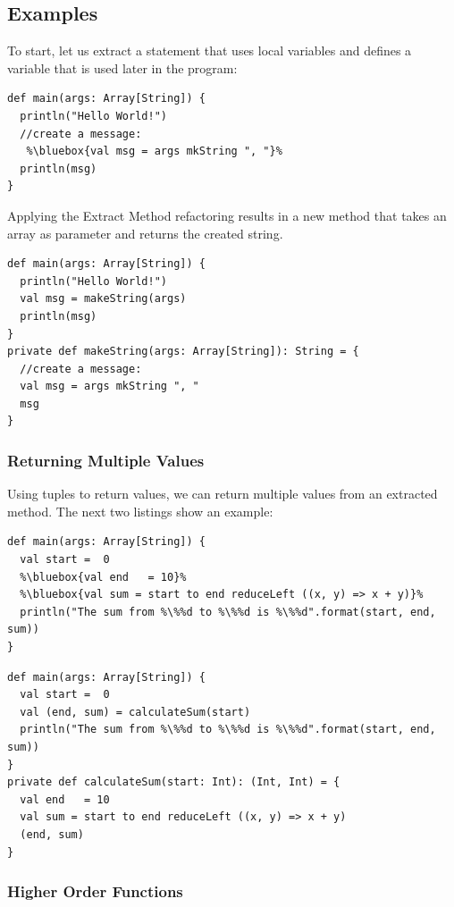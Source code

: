 \documentclass[10pt,a4paper,oneside]{scrreprt}
\begin{document}
\subsection{Examples}

To start, let us extract a statement that uses local variables and defines a variable that is used later in the program:

\begin{lstlisting}
def main(args: Array[String]) {
  println("Hello World!")
  //create a message:
   %\bluebox{val msg = args mkString ", "}%
  println(msg)
}
\end{lstlisting}

Applying the Extract Method refactoring results in a new method that takes an array as parameter and returns the created string.

\begin{lstlisting}
def main(args: Array[String]) {
  println("Hello World!")
  val msg = makeString(args)
  println(msg)
}
private def makeString(args: Array[String]): String = {
  //create a message:
  val msg = args mkString ", "
  msg
}
\end{lstlisting}

\subsubsection{Returning Multiple Values}

Using tuples to return values, we can return multiple values from an extracted method. The next two listings show an example:

\begin{lstlisting}    
def main(args: Array[String]) {
  val start =  0
  %\bluebox{val end   = 10}%
  %\bluebox{val sum = start to end reduceLeft ((x, y) => x + y)}%
  println("The sum from %\%%d to %\%%d is %\%%d".format(start, end, sum))
}
\end{lstlisting}

\begin{lstlisting}        
def main(args: Array[String]) {
  val start =  0
  val (end, sum) = calculateSum(start)
  println("The sum from %\%%d to %\%%d is %\%%d".format(start, end, sum))
}
private def calculateSum(start: Int): (Int, Int) = {
  val end   = 10
  val sum = start to end reduceLeft ((x, y) => x + y)
  (end, sum)
}
\end{lstlisting}

\subsubsection{Higher Order Functions}
\end{document}
